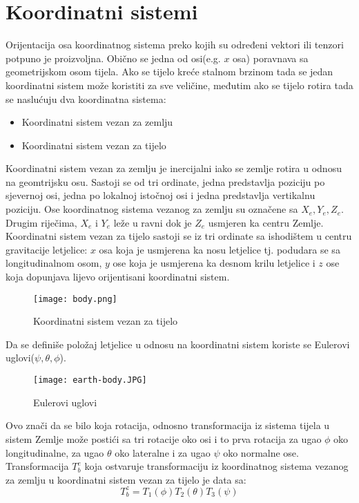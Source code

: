 \section{Koordinatni sistemi}
Orijentacija osa koordinatnog sistema preko kojih su određeni 
vektori ili tenzori potpuno je proizvoljna. Obično se jedna od osi(e.g. $x$ osa) poravnava 
sa geometrijskom osom tijela. 
Ako se tijelo kreće stalnom brzinom tada se jedan koordinatni sistem može 
koristiti za sve veličine, međutim ako se tijelo rotira tada se naslućuju dva koordinatna sistema:
\begin{itemize}
    \item Koordinatni sistem vezan za zemlju
    \item Koordinatni sistem vezan za tijelo
\end{itemize}
Koordinatni sistem vezan za zemlju je inercijalni iako se zemlje rotira u odnosu na geomtrijsku osu.
Sastoji se od tri ordinate, jedna predstavlja poziciju po sjevernoj osi, jedna po lokalnoj istočnoj osi 
i jedna predstavlja vertikalnu poziciju. Ose koordinatnog sistema vezanog za zemlju su 
označene sa $X_e, Y_e, Z_e$. Drugim riječima, $X_e$ i $Y_e$ leže u ravni dok je $Z_e$ usmjeren ka centru Zemlje.\\
Koordinatni sistem vezan za tijelo sastoji se iz tri ordinate sa ishodištem u centru gravitacije letjelice: $x$ osa koja je
usmjerena ka nosu letjelice tj. podudara se sa longitudinalnom osom, $y$ ose koja je usmjerena ka desnom krilu letjelice i $z$ ose koja dopunjava lijevo orijentisani 
koordinatni sistem.
\begin{figure}[!ht]
    \centering
    \texttt{[image: body.png]}
    \caption{Koordinatni sistem vezan za tijelo}
    \label{fig:KBS}
\end{figure}
Da se definiše položaj letjelice u odnosu na koordinatni sistem koriste se Eulerovi uglovi($\psi, \theta, \phi$).
\begin{figure}[!ht]
    \centering
    \texttt{[image: earth-body.JPG]}
    \caption{Eulerovi uglovi}
\end{figure}
Ovo znači da se bilo koja rotacija, odnosno transformacija iz sistema tijela u sistem Zemlje može postići sa tri rotacije oko osi i to prva 
rotacija za ugao $\phi$ oko longitudinalne, za ugao $\theta$ oko lateralne i za ugao 
$\psi$ oko normalne ose. Transformacija $T_b^e$ koja ostvaruje transformaciju iz 
koordinatnog sistema vezanog za zemlju u koordinatni sistem vezan za tijelo je data sa:
\begin{equation}
    T_{b}^z = T_1(\phi)T_2(\theta)T_3(\psi)
\end{equation}
